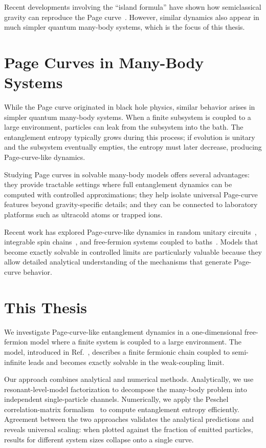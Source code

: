 \documentclass[12pt,oneside,openright]{report}
\theoremstyle{definition}
\theoremstyle{plain}
\theoremstyle{remark}
\begin{document}
Recent developments involving the ``island formula'' have shown how semiclassical gravity can reproduce the Page curve~\cite{Penington2020,Almheiri2019,Almheiri2020}.
However, similar dynamics also appear in much simpler quantum many-body systems, which is the focus of this thesis.

\section{Page Curves in Many-Body Systems}

While the Page curve originated in black hole physics, similar behavior arises in simpler quantum many-body systems.
When a finite subsystem is coupled to a large environment, particles can leak from the subsystem into the bath.
The entanglement entropy typically grows during this process; if evolution is unitary and the subsystem eventually empties, the entropy must later decrease, producing Page-curve-like dynamics.

Studying Page curves in solvable many-body models offers several advantages:
they provide tractable settings where full entanglement dynamics can be computed with controlled approximations;
they help isolate universal Page-curve features beyond gravity-specific details;
and they can be connected to laboratory platforms such as ultracold atoms or trapped ions.

Recent work has explored Page-curve-like dynamics in random unitary circuits~\cite{Nahum2017}, integrable spin chains~\cite{Alba2017}, and free-fermion systems coupled to baths~\cite{Kehrein_2024}.
Models that become exactly solvable in controlled limits are particularly valuable because they allow detailed analytical understanding of the mechanisms that generate Page-curve behavior.

\section{This Thesis}

We investigate Page-curve-like entanglement dynamics in a one-dimensional free-fermion model where a finite system is coupled to a large environment.
The model, introduced in Ref.~\cite{Kehrein_2024}, describes a finite fermionic chain coupled to semi-infinite leads and becomes exactly solvable in the weak-coupling limit.

Our approach combines analytical and numerical methods.
Analytically, we use resonant-level-model factorization to decompose the many-body problem into independent single-particle channels.
Numerically, we apply the Peschel correlation-matrix formalism~\cite{Peschel_2003} to compute entanglement entropy efficiently.
Agreement between the two approaches validates the analytical predictions and reveals universal scaling: when plotted against the fraction of emitted particles, results for different system sizes collapse onto a single curve.
\end{document}
